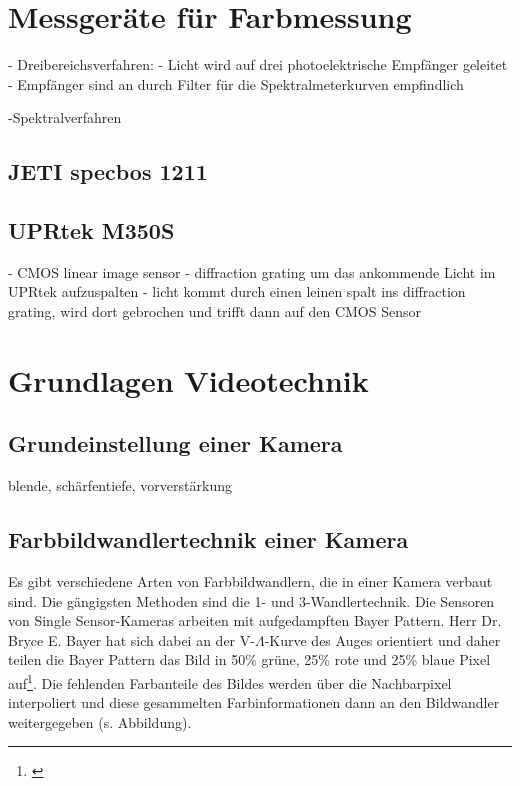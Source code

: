 \chapter{Messgeräte für Farbmessung}
- Dreibereichsverfahren:
- Licht wird auf drei photoelektrische Empfänger geleitet
- Empfänger sind an durch Filter für die Spektralmeterkurven empfindlich

-Spektralverfahren
 
\section{JETI specbos 1211}

\section{UPRtek M350S}
- CMOS linear image sensor
- diffraction grating um das ankommende Licht im UPRtek aufzuspalten
- licht kommt durch einen leinen spalt ins diffraction grating, wird dort gebrochen und trifft dann auf den CMOS Sensor


\chapter{Grundlagen Videotechnik}

\section{Grundeinstellung einer Kamera}

blende, schärfentiefe, vorverstärkung

\section{Farbbildwandlertechnik einer Kamera}
\label{sec_wandler}
Es gibt verschiedene Arten von Farbbildwandlern, die in einer Kamera verbaut sind. Die gängigsten Methoden sind die 1- und 3-Wandlertechnik. Die Sensoren von \glqq Single Sensor\grqq -Kameras arbeiten mit aufgedampften Bayer Pattern. Herr Dr. Bryce E. Bayer hat sich dabei an der V-$\Lambda$-Kurve des Auges orientiert und daher teilen die Bayer Pattern das Bild in 50\% grüne, 25\% rote und 25\% blaue Pixel auf\footnote{\cite{itwissen}}. Die fehlenden Farbanteile des Bildes werden über die Nachbarpixel interpoliert und diese gesammelten Farbinformationen dann an den Bildwandler weitergegeben (s. Abbildung).

